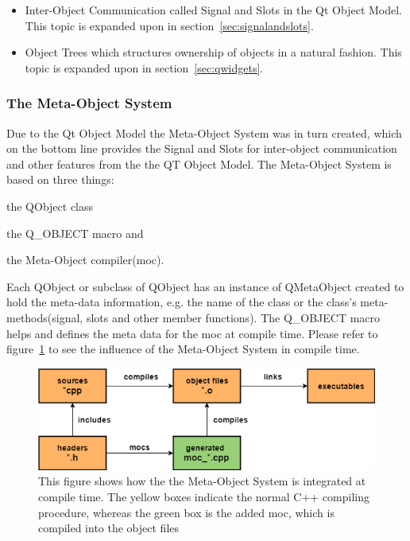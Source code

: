 \begin{itemize}
\item Inter-Object Communication called Signal and Slots in the Qt Object Model. This topic is expanded upon in section~\ref{sec:signalandslots}.
\item Object Trees which structures ownership of objects in a natural fashion. This topic is expanded upon in section~\ref{sec:qwidgets}.
\end{itemize}

\subsubsection{The Meta-Object System}
\label{sec:TheMetaObjectSystem}
Due to the Qt Object Model the Meta-Object System was in turn created, which on the bottom line provides the Signal and Slots for inter-object communication and other features from the the QT Object Model. The Meta-Object System is based on three things:
\begin{enumerate*}[label={\alph*)},font={\color{red!50!black}\bfseries}]
\item the QObject class
\item the Q\_OBJECT macro and
\item the Meta-Object compiler(moc).
\end{enumerate*}
Each QObject or subclass of QObject has an instance of QMetaObject created to hold the meta-data information, e.g. the name of the class or the class's meta-methods(signal, slots and other member functions). The Q\_OBJECT macro helps and defines the meta data for the moc at compile time. Please refer to figure~\ref{fig:QtC++BuildProcess} to see the influence of the Meta-Object System in compile time.

\begin{figure}[h]
	\centering
	\includegraphics[scale=0.55]{Figures/QtC++BuildProcess.png}
	\caption{This figure shows how the the Meta-Object System is integrated at compile time. The yellow boxes indicate the normal C++ compiling procedure, whereas the green box is the added moc, which is compiled into the object files}
	\label{fig:QtC++BuildProcess}
\end{figure}

